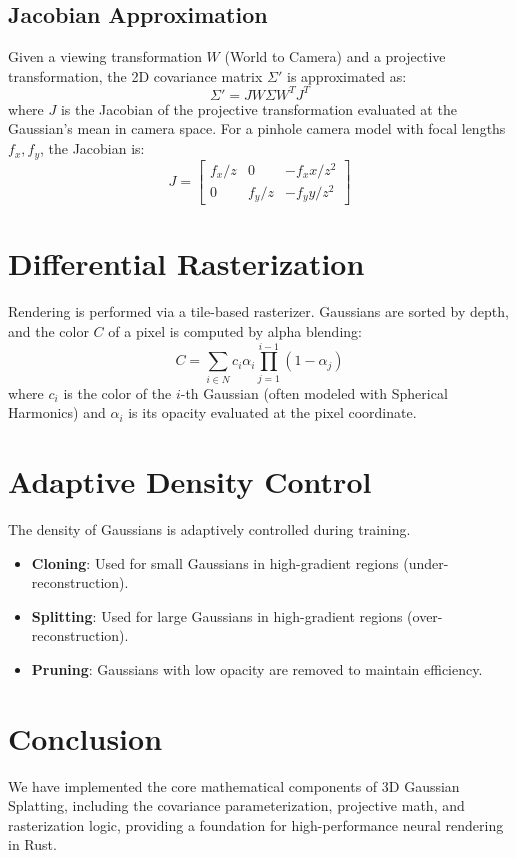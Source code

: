 \documentclass{article}
\begin{document}
\subsection{Jacobian Approximation}
Given a viewing transformation $W$ (World to Camera) and a projective transformation, the 2D covariance matrix $\Sigma'$ is approximated as:
\begin{equation}
\Sigma' = J W \Sigma W^T J^T
\end{equation}
where $J$ is the Jacobian of the projective transformation evaluated at the Gaussian's mean in camera space. For a pinhole camera model with focal lengths $f_x, f_y$, the Jacobian is:
\begin{equation}
J = \begin{bmatrix}
f_x/z & 0 & -f_x x / z^2 \\
0 & f_y/z & -f_y y / z^2
\end{bmatrix}
\end{equation}

\section{Differential Rasterization}
Rendering is performed via a tile-based rasterizer. Gaussians are sorted by depth, and the color $C$ of a pixel is computed by alpha blending:
\begin{equation}
C = \sum_{i \in N} c_i \alpha_i \prod_{j=1}^{i-1} (1 - \alpha_j)
\end{equation}
where $c_i$ is the color of the $i$-th Gaussian (often modeled with Spherical Harmonics) and $\alpha_i$ is its opacity evaluated at the pixel coordinate.

\section{Adaptive Density Control}
The density of Gaussians is adaptively controlled during training.
\begin{itemize}
    \item \textbf{Cloning}: Used for small Gaussians in high-gradient regions (under-reconstruction).
    \item \textbf{Splitting}: Used for large Gaussians in high-gradient regions (over-reconstruction).
    \item \textbf{Pruning}: Gaussians with low opacity are removed to maintain efficiency.
\end{itemize}

\section{Conclusion}
We have implemented the core mathematical components of 3D Gaussian Splatting, including the covariance parameterization, projective math, and rasterization logic, providing a foundation for high-performance neural rendering in Rust.



\end{document}
